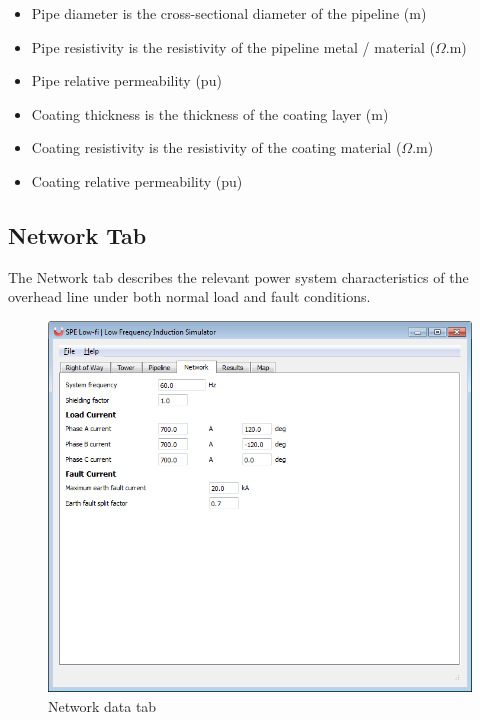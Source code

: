 \documentclass{article}
\begin{document}
\begin{itemize}
\item Pipe diameter is the cross-sectional diameter of the pipeline (m)
\item Pipe resistivity is the resistivity of the pipeline metal / material ($\Omega$.m)
\item Pipe relative permeability (pu)
\item Coating thickness is the thickness of the coating layer (m)
\item Coating resistivity is the resistivity of the coating material ($\Omega$.m)
\item Coating relative permeability (pu)
\end{itemize}

\subsection{Network Tab}
The Network tab describes the relevant power system characteristics of the overhead line under both normal load and fault conditions.

\begin{figure}[!htp]
\begin{center}
\caption{Network data tab}
\label{fig:network}
\includegraphics[width=0.9\linewidth]{./Figures/network.png}
\end{center}
\end{figure}
\end{document}
